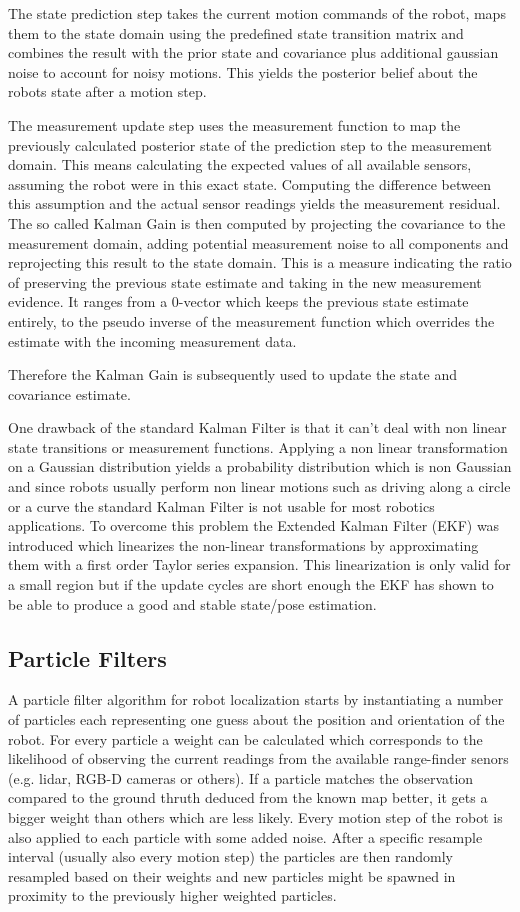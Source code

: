 \documentclass[10pt,journal,compsoc]{IEEEtran}
\begin{document}
The state prediction step takes the current motion commands of the robot, maps them to the state domain using the predefined state transition matrix and combines the result with the prior state and covariance plus additional gaussian noise to account for noisy motions. This yields the posterior belief about the robots state after a motion step.

The measurement update step uses the measurement function to map the previously calculated posterior state of the prediction step to the measurement domain. This means calculating the expected values of all available sensors, assuming the robot were in this exact state. Computing the difference between this assumption and the actual sensor readings yields the measurement residual.
The so called Kalman Gain is then computed by projecting the covariance to the measurement domain, adding potential measurement noise to all components and reprojecting this result to the state domain. This is a measure indicating the ratio of preserving the previous state estimate and taking in the new measurement evidence. It ranges from a 0-vector which keeps the previous state estimate entirely, to the pseudo inverse of the measurement function which overrides the estimate with the incoming measurement data.

Therefore the Kalman Gain is subsequently used to update the state and covariance estimate.

One drawback of the standard Kalman Filter is that it can't deal with non linear state transitions or measurement functions. Applying a non linear transformation on a Gaussian distribution yields a probability distribution which is non Gaussian and since robots usually perform non linear motions such as driving along a circle or a curve the standard Kalman Filter is not usable for most robotics applications.
To overcome this problem the Extended Kalman Filter (EKF) was introduced which linearizes the non-linear transformations by approximating them with a first order Taylor series expansion. This linearization is only valid for a small region but if the update cycles are short enough the EKF has shown to be able to produce a good and stable state/pose estimation.


\subsection{Particle Filters}
A particle filter algorithm for robot localization starts by instantiating a number of particles each representing one guess about the position and orientation of the robot. For every particle a weight can be calculated which corresponds to the likelihood of observing the current readings from the available range-finder senors (e.g.  lidar, RGB-D cameras or others). If a particle matches the observation compared to the ground thruth deduced from the known map better, it gets a bigger weight than others which are less likely. Every motion step of the robot is also applied to each particle with some added noise. After a specific resample interval (usually also every motion step) the particles are then randomly resampled based on their weights and new particles might be spawned in proximity to the previously higher weighted particles. 
\end{document}
